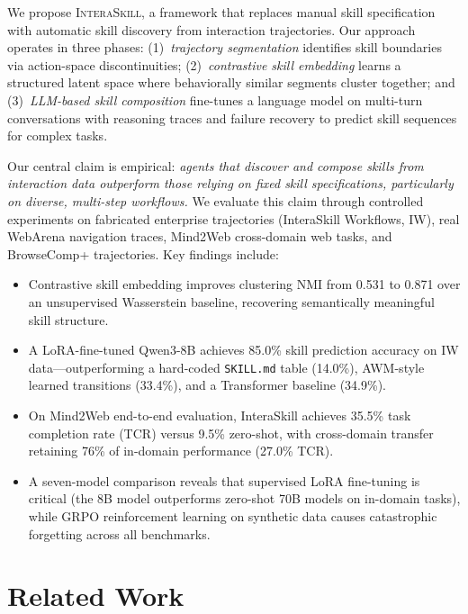 \documentclass{article}
\begin{document}
We propose \textsc{InteraSkill}, a framework that replaces manual skill specification with automatic skill discovery from interaction trajectories. Our approach operates in three phases: (1)~\emph{trajectory segmentation} identifies skill boundaries via action-space discontinuities; (2)~\emph{contrastive skill embedding} learns a structured latent space where behaviorally similar segments cluster together; and (3)~\emph{LLM-based skill composition} fine-tunes a language model on multi-turn conversations with reasoning traces and failure recovery to predict skill sequences for complex tasks.

Our central claim is empirical: \emph{agents that discover and compose skills from interaction data outperform those relying on fixed skill specifications, particularly on diverse, multi-step workflows.} We evaluate this claim through controlled experiments on fabricated enterprise trajectories (InteraSkill Workflows, IW), real WebArena navigation traces, Mind2Web cross-domain web tasks, and BrowseComp+ trajectories. Key findings include:

\begin{itemize}
    \item Contrastive skill embedding improves clustering NMI from 0.531 to 0.871 over an unsupervised Wasserstein baseline, recovering semantically meaningful skill structure.
    \item A LoRA-fine-tuned Qwen3-8B achieves 85.0\% skill prediction accuracy on IW data---outperforming a hard-coded \texttt{SKILL.md} table (14.0\%), AWM-style learned transitions (33.4\%), and a Transformer baseline (34.9\%).
    \item On Mind2Web end-to-end evaluation, InteraSkill achieves 35.5\% task completion rate (TCR) versus 9.5\% zero-shot, with cross-domain transfer retaining 76\% of in-domain performance (27.0\% TCR).
    \item A seven-model comparison reveals that supervised LoRA fine-tuning is critical (the 8B model outperforms zero-shot 70B models on in-domain tasks), while GRPO reinforcement learning on synthetic data causes catastrophic forgetting across all benchmarks.
\end{itemize}

\section{Related Work}
\end{document}
